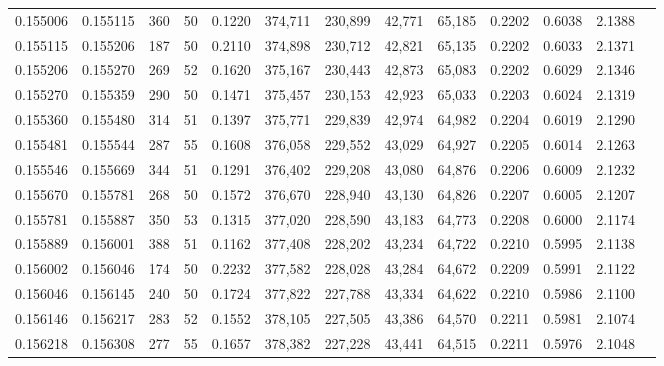 \begin{tabular}{rrrrrrrrrrrrr}
0.155006 & 0.155115 &   360 &  50 &                                     0.1220 & 374,711 & 230,899 &  42,771 &  65,185 & 0.2202 & 0.6038 & 2.1388 \\
0.155115 & 0.155206 &   187 &  50 &                                     0.2110 & 374,898 & 230,712 &  42,821 &  65,135 & 0.2202 & 0.6033 & 2.1371 \\
0.155206 & 0.155270 &   269 &  52 &                                     0.1620 & 375,167 & 230,443 &  42,873 &  65,083 & 0.2202 & 0.6029 & 2.1346 \\
0.155270 & 0.155359 &   290 &  50 &                                     0.1471 & 375,457 & 230,153 &  42,923 &  65,033 & 0.2203 & 0.6024 & 2.1319 \\
0.155360 & 0.155480 &   314 &  51 &                                     0.1397 & 375,771 & 229,839 &  42,974 &  64,982 & 0.2204 & 0.6019 & 2.1290 \\
0.155481 & 0.155544 &   287 &  55 &                                     0.1608 & 376,058 & 229,552 &  43,029 &  64,927 & 0.2205 & 0.6014 & 2.1263 \\
0.155546 & 0.155669 &   344 &  51 &                                     0.1291 & 376,402 & 229,208 &  43,080 &  64,876 & 0.2206 & 0.6009 & 2.1232 \\
0.155670 & 0.155781 &   268 &  50 &                                     0.1572 & 376,670 & 228,940 &  43,130 &  64,826 & 0.2207 & 0.6005 & 2.1207 \\
0.155781 & 0.155887 &   350 &  53 &                                     0.1315 & 377,020 & 228,590 &  43,183 &  64,773 & 0.2208 & 0.6000 & 2.1174 \\
0.155889 & 0.156001 &   388 &  51 &                                     0.1162 & 377,408 & 228,202 &  43,234 &  64,722 & 0.2210 & 0.5995 & 2.1138 \\
0.156002 & 0.156046 &   174 &  50 &                                     0.2232 & 377,582 & 228,028 &  43,284 &  64,672 & 0.2209 & 0.5991 & 2.1122 \\
0.156046 & 0.156145 &   240 &  50 &                                     0.1724 & 377,822 & 227,788 &  43,334 &  64,622 & 0.2210 & 0.5986 & 2.1100 \\
0.156146 & 0.156217 &   283 &  52 &                                     0.1552 & 378,105 & 227,505 &  43,386 &  64,570 & 0.2211 & 0.5981 & 2.1074 \\
0.156218 & 0.156308 &   277 &  55 &                                     0.1657 & 378,382 & 227,228 &  43,441 &  64,515 & 0.2211 & 0.5976 & 2.1048 \\

\end{tabular}

